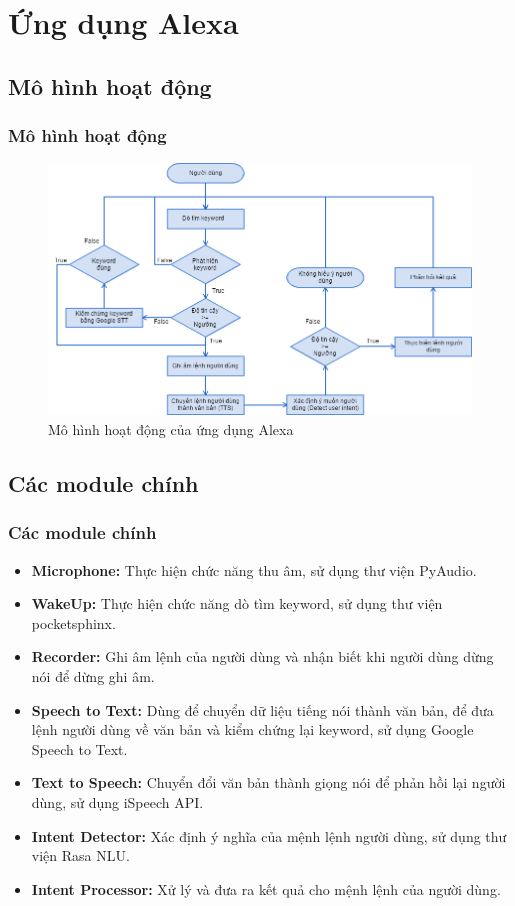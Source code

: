 \documentclass{beamer}
\begin{document}
\section{Ứng dụng Alexa}

\subsection{Mô hình hoạt động}
\begin{frame}
\frametitle{Mô hình hoạt động}
\begin{figure}
\centering
\includegraphics[scale=0.35]{system_flowchart}
\caption{Mô hình hoạt động của ứng dụng Alexa}
\end{figure}
\end{frame}

\subsection{Các module chính}
\begin{frame}
\frametitle{Các module chính}
\begin{itemize}
    \item \textbf{Microphone:} Thực hiện chức năng thu âm, sử dụng thư viện PyAudio.
    \item \textbf{WakeUp:} Thực hiện chức năng dò tìm keyword, sử dụng thư viện pocketsphinx.
    \item \textbf{Recorder:} Ghi âm lệnh của người dùng và nhận biết khi người dùng dừng nói để dừng ghi âm.
    \item \textbf{Speech to Text:} Dùng để chuyển dữ liệu tiếng nói thành văn bản, để đưa lệnh người dùng về văn bản và kiểm chứng lại keyword, sử dụng Google Speech to Text.
    \item \textbf{Text to Speech:} Chuyển đổi văn bản thành giọng nói để phản hồi lại người dùng, sử dụng iSpeech API.
    \item \textbf{Intent Detector:} Xác định ý nghĩa của mệnh lệnh người dùng, sử dụng thư viện Rasa NLU.
    \item \textbf{Intent Processor:} Xử lý và đưa ra kết quả cho mệnh lệnh của người dùng.
\end{itemize}
\end{frame}
\end{document}
